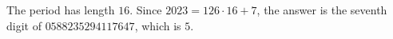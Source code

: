The period has length $16$. Since $2023=126\cdot16+7$, the answer is the seventh digit of $0588235294117647$, which is $\boxed5$.
